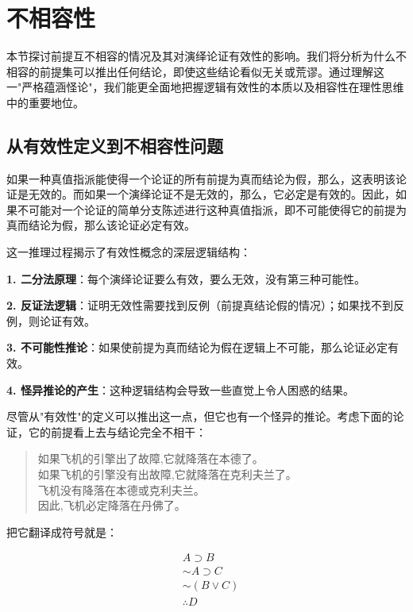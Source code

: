 \section{不相容性}

\begin{logicbox}[title=引言]
本节探讨前提互不相容的情况及其对演绎论证有效性的影响。我们将分析为什么不相容的前提集可以推出任何结论，即使这些结论看似无关或荒谬。通过理解这一"严格蕴涵怪论"，我们能更全面地把握逻辑有效性的本质以及相容性在理性思维中的重要地位。
\end{logicbox}

\subsection{从有效性定义到不相容性问题}

如果一种真值指派能使得一个论证的所有前提为真而结论为假，那么，这表明该论证是无效的。而如果一个演绎论证不是无效的，那么，它必定是有效的。因此，如果不可能对一个论证的简单分支陈述进行这种真值指派，即不可能使得它的前提为真而结论为假，那么该论证必定有效。

\begin{theorembox}[title=有效性的逻辑结构]
这一推理过程揭示了有效性概念的深层逻辑结构：

\textbf{1. 二分法原理}：每个演绎论证要么有效，要么无效，没有第三种可能性。

\textbf{2. 反证法逻辑}：证明无效性需要找到反例（前提真结论假的情况）；如果找不到反例，则论证有效。

\textbf{3. 不可能性推论}：如果使前提为真而结论为假在逻辑上不可能，那么论证必定有效。

\textbf{4. 怪异推论的产生}：这种逻辑结构会导致一些直觉上令人困惑的结果。
\end{theorembox}

尽管从"有效性"的定义可以推出这一点，但它也有一个怪异的推论。考虑下面的论证，它的前提看上去与结论完全不相干：

\begin{quote}
如果飞机的引擎出了故障,它就降落在本德了。\\
如果飞机的引擎没有出故障,它就降落在克利夫兰了。\\
飞机没有降落在本德或克利夫兰。\\
因此,飞机必定降落在丹佛了。
\end{quote}

把它翻译成符号就是：

$$
\begin{aligned}
& A \supset B \\
& \sim A \supset C \\
& \sim(B \vee C) \\
& \therefore D
\end{aligned}
$$

